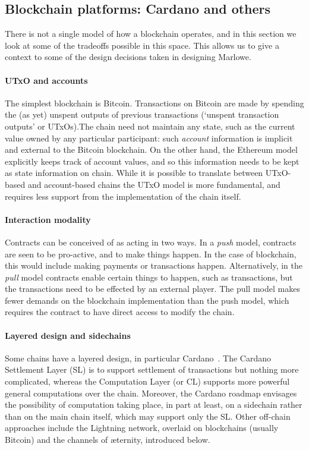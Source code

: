 \documentclass[
      acmsmall
    , screen
    , review=true
  ]{acmart}
\begin{document}
\subsection{Blockchain platforms: Cardano and others}

There is not a single model of how a blockchain operates, and in this section we look at some of the tradeoffs possible in this space. This allows us to give a context to some of the design decisions taken in designing Marlowe.  

\paragraph{UTxO and accounts}

The simplest blockchain is Bitcoin. Transactions on Bitcoin are made by spending the (as yet) unspent outputs of previous transactions (`unspent transaction outputs' or UTxOs).The chain need not maintain any state, such as the current value owned by any particular participant: such \emph{account} information is implicit and external to the Bitcoin blockchain. On the other hand, the Ethereum model explicitly keeps track of account values, and so this information needs to be kept as state information on chain. While it is possible to translate between UTxO-based and account-based chains  the UTxO model is more fundamental, and requires less support from the implementation of the chain itself.

\paragraph{Interaction modality}

Contracts can be conceived of as acting in two ways. In a \emph{push} model, contracts are seen to be pro-active, and to make things happen. In the case of blockchain, this would include making payments or transactions happen. Alternatively, in the \emph{pull} model contracts enable certain things to happen, such as transactions, but the transactions need to be effected by an external player. The pull model makes fewer demands on the blockchain implementation than the push model, which requires the contract to have direct access to modify the chain.

\paragraph{Layered design and sidechains}

Some chains have a layered design, in particular Cardano~\cite{cardano}. The Cardano Settlement Layer (SL) is to support settlement of transactions but nothing more complicated, whereas the Computation Layer (or CL) supports more powerful general computations over the chain. Moreover, the Cardano roadmap \cite{cardano-rationale} envisages the possibility of computation taking place, in part at least, on a sidechain rather than on the main chain itself, which may support only the SL. Other off-chain approaches include the Lightning network, overlaid on blockchains (usually Bitcoin) and the channels of \ae{}ternity, introduced below.
\end{document}

